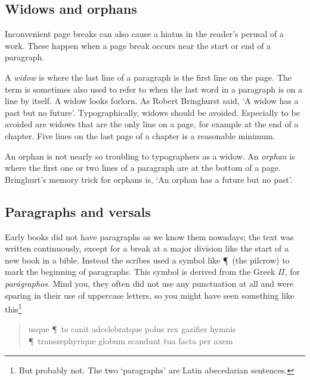 \documentclass[10pt,letterpaper]{memoir}
\begin{document}

\subsection{Widows and orphans}

    Inconvenient page breaks can also cause a hiatus in the reader's perusal
of a work. These happen when a page break occurs near the start or end of
a paragraph. 

    A \emph{widow} is where the last line of a paragraph is the first
line on the page. The term is sometimes also used to refer to when the
last word in a paragraph is on a line by itself. A widow looks forlorn. 
As Robert Bringhurst said, `A widow has a past but no future'.
Typographically, widows should be avoided. Especially to be avoided 
are widows that are
the only line on a page, for example at the end of a chapter. Five lines
on the last page of a chapter is a reasonable minimum.

    An orphan is not nearly so troubling to typographers as a widow. An
\emph{orphan} is where the first one or two lines of a paragraph are at the
bottom of a page. Bringhurt's memory trick for orphans is, `An orphan has
a future but no past'.

\subsection{Paragraphs and versals} \label{sec:versal}


    Early books did not have paragraphs as we know them nowadays; the text
was written continuously, except for a break at a major division like the
start of a new book in a bible. Instead
the scribes used a symbol like \P\ (the pilcrow) to mark the beginning of
paragraphs. This symbol is derived from the Greek $\Pi$, for
\textit{par\'{a}graphos}. Mind you, they often did not use any punctuation
at all and were sparing in their use of uppercase letters, 
so you might have seen something like this\footnote{But probably not.
The two `paragraphs' are Latin abecedarian sentences.}

\begin{quote}
usque \P\ te canit adcelebratque polus rex gazifier hymnis 
       \P\ transzephyrique globum scandunt tua facta per axem
\end{quote}
\end{document}
